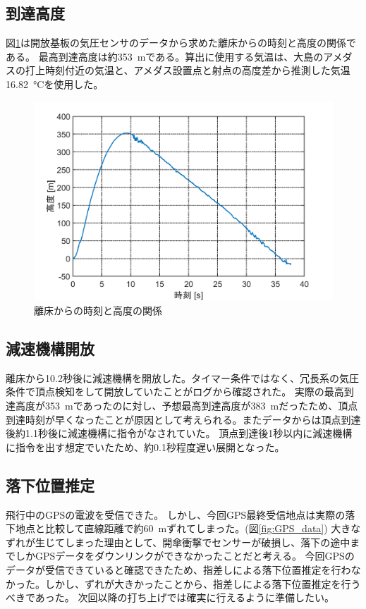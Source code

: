\documentclass[a4paper,11pt,titlepage,uplatex]{jsarticle}
\begin{document}
\subsection{到達高度}
図\ref{fig:height_data}は開放基板の気圧センサのデータから求めた離床からの時刻と高度の関係である。
最高到達高度は約\SI{353}{m}である。算出に使用する気温は、大島のアメダスの打上時刻付近の気温と、アメダス設置点と射点の高度差から推測した気温\SI{16.82}{\degreeCelsius}を使用した。
\begin{figure}[H]
	\centering
	\includegraphics[width=0.8\linewidth]{pic_avi/height_data.png}
	\caption{離床からの時刻と高度の関係}
	\label{fig:height_data}
\end{figure}


\subsection{減速機構開放}
離床から10.2秒後に減速機構を開放した。タイマー条件ではなく、冗長系の気圧条件で頂点検知をして開放していたことがログから確認された。
実際の最高到達高度が\SI{353}{m}であったのに対し、予想最高到達高度が\SI{383}{m}だったため、頂点到達時刻が早くなったことが原因として考えられる。またデータからは頂点到達後約1.1秒後に減速機構に指令がなされていた。
頂点到達後1秒以内に減速機構に指令を出す想定でいたため、約0.1秒程度遅い展開となった。

\subsection{落下位置推定}
飛行中のGPSの電波を受信できた。
しかし、今回GPS最終受信地点は実際の落下地点と比較して直線距離で約\SI{60}{m}ずれてしまった。(図\ref{fig:GPS_data})
大きなずれが生じてしまった理由として、開傘衝撃でセンサーが破損し、落下の途中までしかGPSデータをダウンリンクができなかったことだと考える。
今回GPSのデータが受信できていると確認できたため、指差しによる落下位置推定を行わなかった。しかし、ずれが大きかったことから、指差しによる落下位置推定を行うべきであった。
次回以降の打ち上げでは確実に行えるように準備したい。
\end{document}
